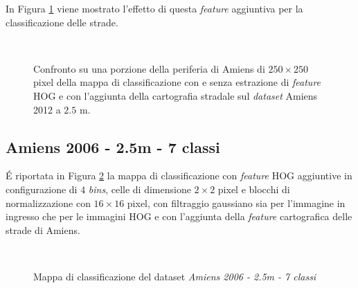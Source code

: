 In Figura \ref{fig:confrontoAmiens2012_2_5m} viene mostrato l'effetto
di questa \emph{feature} aggiuntiva per la classificazione delle
strade.


\begin{figure}[!ht]
\center
{}
\hspace{3mm}
\\
\caption{Confronto su una porzione della periferia di Amiens di
$250\times250$ pixel della mappa di classificazione con e senza
estrazione di \emph{feature} HOG e con l'aggiunta della cartografia
stradale sul \emph{dataset} Amiens 2012 a $2.5$ m. }
\label{fig:confrontoAmiens2012_2_5m}
\end{figure}

\clearpage

\subsection{Amiens 2006 - 2.5m - 7 classi}

\'E riportata in Figura \ref{fig:ClassMap_Amiens2006_2_5m_roadsandhog}
la mappa di classificazione con \emph{feature} HOG aggiuntive in
configurazione di $4$ \emph{bins}, celle di dimensione $2\times2$
pixel e blocchi di normalizzazione con $16\times16$ pixel, con
filtraggio gaussiano sia per l'immagine in ingresso che per le
immagini HOG e con l'aggiunta della \emph{feature} cartografica delle
strade di Amiens.

\begin{figure}[!ht]

\center
{}
\\
\caption{Mappa di classificazione del dataset \emph{Amiens 2006 - 2.5m
- 7 classi}}
\label{fig:ClassMap_Amiens2006_2_5m_roadsandhog}

\end{figure}

